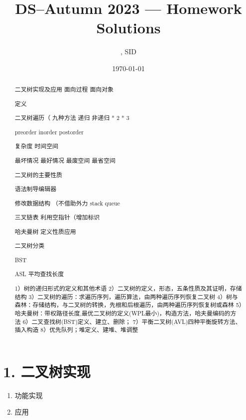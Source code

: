 \documentclass[UTF8]{ctexart}
\title{DS--Autumn 2023 --- Homework \Homework Solutions}
\author{\Name, SID \SID}
\date{\today}
\newenvironment{qparts}{\begin{enumerate}[{(}a{)}]}{\end{enumerate}} %
\begin{document}
\maketitle


\begin{abstract}
    二叉树实现及应用 面向过程 面向对象

    定义
    
    二叉树遍历（ 九种方法 递归 非递归 * 2 * 3 

    preorder inorder postorder 

    复杂度 时间空间

    最坏情况 最好情况 最废空间 最省空间

    二叉树的主要性质

    语法制导编辑器

    修改数据结构 （不借助外力 stack queue 

    三叉链表 利用空指针（增加标识

    哈夫曼树 定义性质应用

    二叉树分类

    BST

    ASL 平均查找长度

    1）树的递归形式的定义和其他术语
    2）二叉树的定义，形态，五条性质及其证明，存储结构
    3）二叉树的遍历：求遍历序列，遍历算法，由两种遍历序列恢复二叉树
    4）树与森林：存储结构，与二叉树的转换，先根和后根遍历，由两种遍历序列恢复树或森林
    5）哈夫曼树：带权路径长度,最优二叉树的定义(WPL最小)，构造方法，哈夫曼编码的方法
    6）二叉查找树(BST)定义、建立、删除；
    7）平衡二叉树(AVL)四种平衡旋转方法、插入构造
    8）优先队列；堆定义、建堆、堆调整
  
    
\end{abstract}













\section*{1. 二叉树实现}
\begin{qparts}
    \item 
    功能实现
    
    \item
    应用 
\end{qparts}
\end{document}
